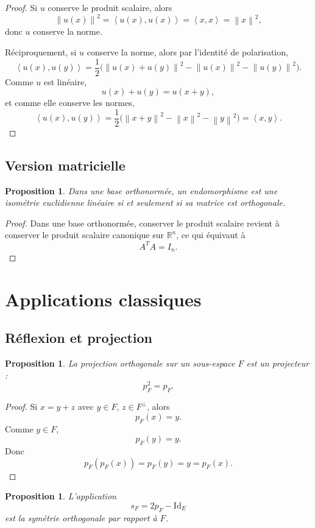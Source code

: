 \documentclass[11pt,a4paper]{article}
\newtheorem{proposition}[definition]{Proposition}
\theoremstyle{remark}
\newcommand{\R}{\mathbb{R}}
\newcommand{\id}{\mathrm{Id}}
\newcommand{\Norm}[1]{\left\|#1\right\|}
\newcommand{\scal}[2]{\left\langle #1,#2\right\rangle}
\newcommand{\Orth}{\perp}
\begin{document}
\begin{proof}
Si \(u\) conserve le produit scalaire, alors
\[
\Norm{u(x)}^2=\scal{u(x)}{u(x)}=\scal{x}{x}=\Norm{x}^2,
\]
donc \(u\) conserve la norme.

Réciproquement, si \(u\) conserve la norme, alors par l’identité de polarisation,
\[
\scal{u(x)}{u(y)}
=
\frac12\big(\Norm{u(x)+u(y)}^2-\Norm{u(x)}^2-\Norm{u(y)}^2\big).
\]
Comme \(u\) est linéaire,
\[
u(x)+u(y)=u(x+y),
\]
et comme elle conserve les normes,
\[
\scal{u(x)}{u(y)}=\frac12\big(\Norm{x+y}^2-\Norm{x}^2-\Norm{y}^2\big)=\scal{x}{y}.
\]
\end{proof}

\subsection{Version matricielle}

\begin{proposition}
Dans une base orthonormée, un endomorphisme est une isométrie euclidienne linéaire si et seulement si sa matrice est orthogonale.
\end{proposition}

\begin{proof}
Dans une base orthonormée, conserver le produit scalaire revient à conserver le produit scalaire canonique sur \(\R^n\), ce qui équivaut à
\[
A^TA=I_n.
\]
\end{proof}

\section{Applications classiques}

\subsection{Réflexion et projection}

\begin{proposition}
La projection orthogonale sur un sous-espace \(F\) est un projecteur :
\[
p_F^2=p_F.
\]
\end{proposition}

\begin{proof}
Si \(x=y+z\) avec \(y\in F\), \(z\in F^\Orth\), alors
\[
p_F(x)=y.
\]
Comme \(y\in F\),
\[
p_F(y)=y.
\]
Donc
\[
p_F(p_F(x))=p_F(y)=y=p_F(x).
\]
\end{proof}

\begin{proposition}
L’application
\[
s_F=2p_F-\id_E
\]
est la symétrie orthogonale par rapport à \(F\).
\end{proposition}
\end{document}
